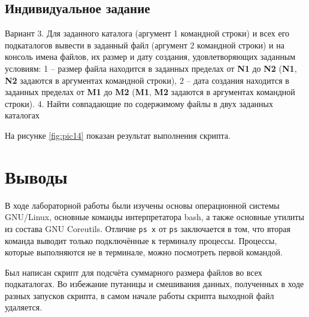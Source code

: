 \subsection{Индивидуальное задание}
\label{sec:job:personal_task}

Вариант 3. Для заданного каталога (аргумент 1 командной строки) и всех его подкаталогов вывести в заданный файл (аргумент 2 командной строки) и на консоль имена файлов, их размер и дату создания, удовлетворяющих заданным условиям: 1 – размер файла находится в заданных пределах от \textbf{N1} до \textbf{N2} (\textbf{N1}, \textbf{N2} задаются в аргументах командной строки), 2 – дата создания находится в заданных пределах от \textbf{M1} до \textbf{M2} (\textbf{M1}, \textbf{M2} задаются в аргументах командной строки).
4. Найти совпадающие по содержимому файлы в двух заданных каталогах



На рисунке \ref{fig:pic14} показан результат выполнения скрипта.


\section{Выводы}
\label{sec:out}

В ходе лабораторной работы были изучены основы операционной системы GNU/Linux, основные команды интерпретатора bash, а также основные утилиты из состава GNU Coreutils. Отличие \lstinline{ps x} от \lstinline{ps} заключается в том, что вторая команда выводит только подключённые к терминалу процессы. Процессы, которые выполняются не в терминале, можно посмотреть первой командой.

Был написан скрипт для подсчёта суммарного размера файлов во всех подкаталогах. Во избежание путаницы и смешивания данных, полученных в ходе разных запусков скрипта, в самом начале работы скрипта выходной файл удаляется.
